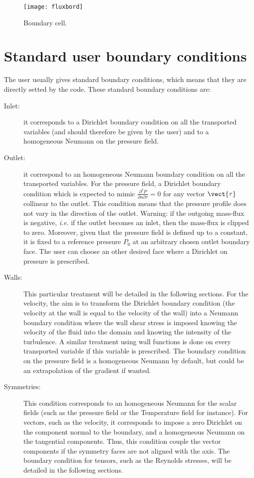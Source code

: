 \begin{figure}[h]
\centerline{\texttt{[image: fluxbord]}}
\caption{\label{Base_Condli_fig_flux_condli}Boundary cell.}
\end{figure}

\section{Standard user boundary conditions}

The user usually gives standard boundary conditions, which means that 
they are directly setted by the code. These standard boundary conditions are:

\begin{description}
\item[Inlet:] it corresponds to a Dirichlet boundary condition on all the transported variables 
(and should therefore be given by the user) 
and to a homogeneous Neumann on the pressure field. 

\item[Outlet:] it correspond to an homogeneous Neumann boundary condition on all the transported variables.
For the pressure field, a Dirichlet boundary condition which is expected to mimic $\displaystyle\frac{\partial^2 P}{\partial n \partial \tau}=0$ for any vector  $\vect{\tau}$ collinear to the outlet. This condition means that the pressure
profile does not vary in the direction of the outlet. Warning: if the outgoing mass-flux is negative, 
\emph{i.e.} if the outlet becomes an inlet, then the mass-flux is clipped to zero. Moreover, given
that the pressure field is defined up to a constant, it is fixed to a reference pressure $P_0$
at an arbitrary chosen outlet boundary face. 
The user can choose an other desired face where a Dirichlet on pressure is prescribed.
 
\item[Walls:] This particular treatment will be detailed in the following sections. 
For the velocity, the aim is to transform the Dirichlet boundary condition (the velocity at the wall 
is equal to the velocity of the wall) into a Neumann boundary condition where the wall shear stress
is imposed knowing the velocity of the fluid into the domain and knowing the intensity of the turbulence. 
A similar treatment using wall functions is done on every transported variable if this variable is prescribed.
The boundary condition on the pressure field is a homogeneous Neumann by default, but could
be an extrapolation of the gradient if wanted.

\item[Symmetries:] This condition corresponds to an homogeneous Neumann for the scalar fields 
(such as the pressure field or the Temperature field for instance). For vectors, such as the velocity, it corresponds
to impose a zero Dirichlet on the component normal to the boundary, and a homogeneous Neumann
on the tangential components. Thus, this condition couple the  vector components if the symmetry faces are not
aligned with the axis. The boundary condition for tensors, such as the Reynolds stresses, will be detailed in the following sections.
\end{description}

